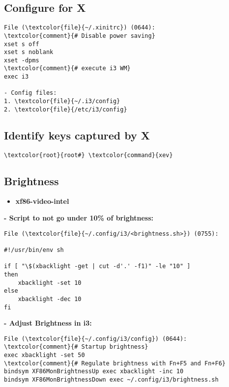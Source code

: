 \documentclass[10pt, a4paper, onecolumn, openany]{book}         %
\begin{document}
\subsection{Configure for X}
\begin{Verbatim}[commandchars=\\\{\}]
File (\textcolor{file}{~/.xinitrc}) (0644):
\textcolor{comment}{# Disable power saving}
xset s off
xset s noblank
xset -dpms
\textcolor{comment}{# execute i3 WM}
exec i3

- Config files:
1. \textcolor{file}{~/.i3/config}
2. \textcolor{file}{/etc/i3/config}
\end{Verbatim}

\subsection{Identify keys captured by X}
\begin{Verbatim}[commandchars=\\\{\}]
    \textcolor{root}{root#} \textcolor{command}{xev}
\end{Verbatim}

\subsection{Brightness}
\begin{itemize}
    \item \textbf{xf86-video-intel}
\end{itemize}

\textbf{- Script to not go under 10\% of brightness:}
\begin{Verbatim}[commandchars=\\\{\}]
File (\textcolor{file}{~/.config/i3/<brightness.sh>}) (0755):

#!/usr/bin/env sh

if [ "\$(xbacklight -get | cut -d'.' -f1)" -le "10" ]
then
    xbacklight -set 10
else
    xbacklight -dec 10
fi
\end{Verbatim}
\textbf{- Adjust Brightness in i3:}
\begin{Verbatim}[commandchars=\\\{\}]
File (\textcolor{file}{~/.config/i3/config}) (0644):
\textcolor{comment}{# Startup brightness}
exec xbacklight -set 50
\textcolor{comment}{# Regulate brightness with Fn+F5 and Fn+F6}
bindsym XF86MonBrightnessUp exec xbacklight -inc 10
bindsym XF86MonBrightnessDown exec ~/.config/i3/brightness.sh
\end{Verbatim}
\end{document}
